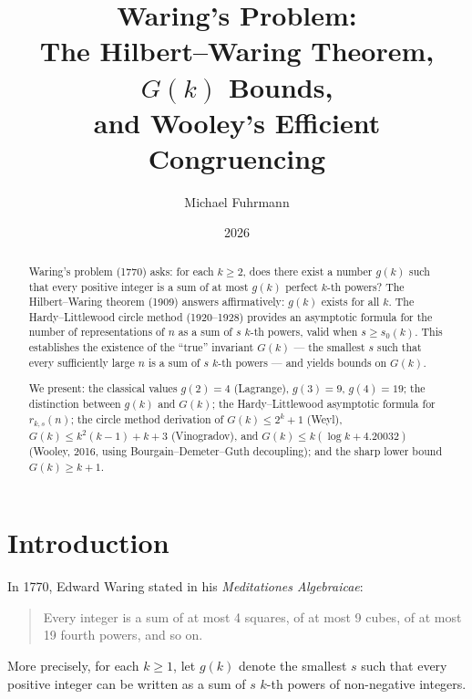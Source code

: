 \documentclass[12pt,a4paper]{amsart}
\theoremstyle{definition}
\begin{document}
\title{Waring's Problem:\\
       The Hilbert--Waring Theorem, $G(k)$ Bounds,\\
       and Wooley's Efficient Congruencing}

\author{Michael Fuhrmann}
\address{Specialist Mathematics Project, Build 80}
\date{2026}

\begin{abstract}
Waring's problem (1770) asks: for each $k \geq 2$, does there exist a number
$g(k)$ such that every positive integer is a sum of at most $g(k)$ perfect
$k$-th powers?  The Hilbert--Waring theorem (1909) answers affirmatively:
$g(k)$ exists for all $k$.  The Hardy--Littlewood circle method (1920--1928)
provides an asymptotic formula for the number of representations of $n$ as
a sum of $s$ $k$-th powers, valid when $s \geq s_0(k)$.  This establishes
the existence of the ``true'' invariant $G(k)$ --- the smallest $s$ such
that every sufficiently large $n$ is a sum of $s$ $k$-th powers --- and yields
bounds on $G(k)$.

We present:  the classical values $g(2) = 4$ (Lagrange), $g(3) = 9$,
$g(4) = 19$; the distinction between $g(k)$ and $G(k)$; the Hardy--Littlewood
asymptotic formula for $r_{k,s}(n)$; the circle method derivation of
$G(k) \leq 2^k + 1$ (Weyl), $G(k) \leq k^2(k-1) + k + 3$ (Vinogradov),
and $G(k) \leq k(\log k + 4.20032)$ (Wooley, 2016, using Bourgain--Demeter--Guth
decoupling); and the sharp lower bound $G(k) \geq k + 1$.
\end{abstract}

\maketitle
\tableofcontents

\section{Introduction}

In 1770, Edward Waring stated in his \emph{Meditationes Algebraicae}:
\begin{quote}
  Every integer is a sum of at most 4 squares, of at most 9 cubes, of
  at most 19 fourth powers, and so on.
\end{quote}
More precisely, for each $k \geq 1$, let $g(k)$ denote the smallest $s$
such that every positive integer can be written as a sum of $s$ $k$-th
powers of non-negative integers.
\end{document}
